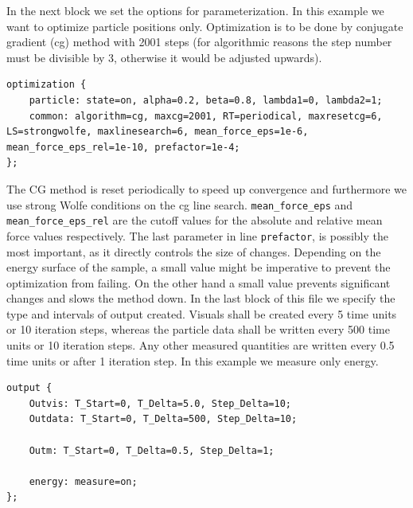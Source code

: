 In the next block we set the options for parameterization. In this example we want to optimize particle positions only.
Optimization is to be done by conjugate gradient (cg) method with 2001 steps (for algorithmic reasons the step number must be divisible by 3, otherwise it would be adjusted upwards).
\begin{lstlisting}
optimization {
    particle: state=on, alpha=0.2, beta=0.8, lambda1=0, lambda2=1;
    common: algorithm=cg, maxcg=2001, RT=periodical, maxresetcg=6, LS=strongwolfe, maxlinesearch=6, mean_force_eps=1e-6, mean_force_eps_rel=1e-10, prefactor=1e-4;
};
\end{lstlisting}

The CG method is reset periodically to speed up convergence and furthermore we use strong Wolfe conditions on the cg line search.
\texttt{mean\_force\_eps} and \texttt{mean\_force\_eps\_rel} are the cutoff values for the absolute and relative mean force values respectively.
The last parameter in line \texttt{prefactor}, is possibly the most important, as it directly controls the size of changes.
Depending on the energy surface of the sample, a small value might be imperative to prevent the optimization from failing.
On the other hand a small value prevents significant changes and slows the method down.
\bigbreak
In the last block of this file we specify the type and intervals of output created.  Visuals shall be created every 5 time units or 10 iteration steps, whereas the particle data shall be written every 500 time units or 10 iteration steps. Any other measured quantities are written every 0.5 time units or after 1 iteration step.
In this example we measure only energy.
\begin{lstlisting}
output {
    Outvis: T_Start=0, T_Delta=5.0, Step_Delta=10;
    Outdata: T_Start=0, T_Delta=500, Step_Delta=10;

    Outm: T_Start=0, T_Delta=0.5, Step_Delta=1;

    energy: measure=on;
};
\end{lstlisting}

